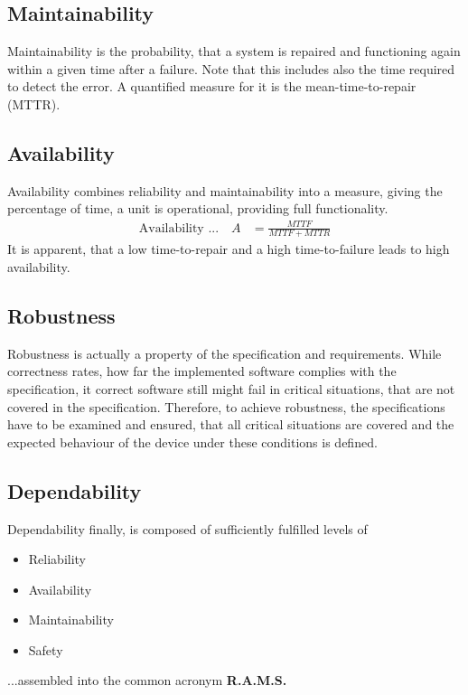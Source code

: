 	\subsection{Maintainability}
	{Maintainability} is the probability, that a system is repaired and functioning again within a given time after a failure. Note that this includes also the time required to detect the error.
	A quantified measure for it is the mean-time-to-repair (MTTR).
	\subsection{Availability}
	{Availability} combines reliability and maintainability into a measure, giving the percentage of time, a unit is operational, providing full functionality.
		\begin{align*}
	\textrm{Availability ...} \quad A & = \frac{MTTF}{MTTF + MTTR}
		\end{align*}
	It is apparent, that a low time-to-repair and a high time-to-failure leads to high availability.
	\subsection{Robustness}
		Robustness is actually a property of the specification and requirements. While correctness rates, how far the implemented software complies with the specification, it correct software still might fail in critical situations, that are not covered in the specification. Therefore, to achieve robustness, the specifications have to be examined and ensured, that all critical situations are covered and the expected behaviour of the device under these conditions is defined.
	\subsection{Dependability}
	{Dependability} finally, is composed of sufficiently fulfilled levels of \\
		\begin{itemize}
			\item Reliability
			\item Availability
			\item Maintainability
			\item Safety
		\end{itemize}
	...assembled into the common acronym {\bf R.A.M.S.}
	
